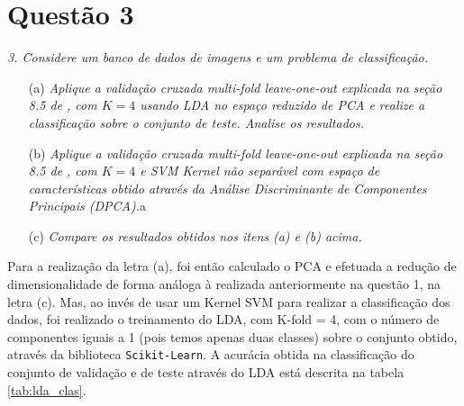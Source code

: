 \documentclass[]{abntex2}
\begin{document}

\section*{\textbf{Questão 3}}

\textit{3. Considere um banco de dados de imagens e um problema de classificação.}

\begin{enumerate}
    \item[(a)] \textit{ Aplique a validação cruzada multi-fold leave-one-out explicada na seção 8.5 de \cite{book}, com $K = 4$ usando LDA no espaço reduzido de PCA e realize a classificação sobre o conjunto de teste. Analise os resultados.}
    
    \item[(b)] \textit{ Aplique a validação cruzada multi-fold leave-one-out explicada na seção 8.5 de \cite{book}, com $K = 4$ e SVM Kernel não separável com espaço de características obtido através da Análise Discriminante de Componentes Principais (DPCA).}a
    
    \item[(c)] \textit{ Compare os resultados obtidos nos itens (a) e (b) acima.}
\end{enumerate}

Para a realização da letra (a), foi então calculado o PCA e efetuada a redução de dimensionalidade de forma análoga à realizada anteriormente na questão 1, na letra (c). Mas, ao invés de usar um Kernel SVM para realizar a classificação dos dados, foi realizado o treinamento do LDA, com K-fold = 4, com o número de componentes iguais a 1 (pois temos apenas duas classes) sobre o conjunto obtido, através da biblioteca \texttt{Scikit-Learn}. A acurácia obtida na classificação do conjunto de validação e de teste através do LDA está descrita na tabela \ref{tab:lda_clas}.
\end{document}
